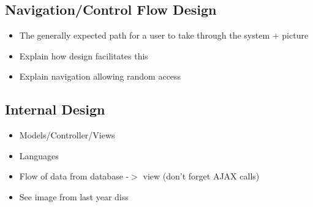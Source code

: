 \subsection{Navigation/Control Flow Design}	
\label{subsec:nav}	

{\color{red}
	\begin{itemize}
		\item The generally expected path for a user to take through the system + picture
		\item Explain how design facilitates this
		\item Explain navigation allowing random access		
	\end{itemize}
}

\subsection{Internal Design}
{\color{red}
	\begin{itemize}
		\item Models/Controller/Views
		\item Languages
		\item Flow of data from database -$>$ view (don't forget AJAX calls)
		\item See image from last year diss
	\end{itemize}
}
